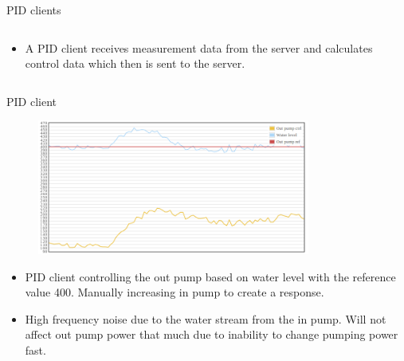 \documentclass{beamer}
\begin{document}
\begin{frame}{PID clients}
\begin{columns}[T]
    \begin{column}{.55\textwidth}
        \begin{itemize}
            \item A PID client receives measurement data from the server and calculates control data which then is sent to the server.            
        \end{itemize}
    \end{column}
    \end{columns}
\end{frame}

\begin{frame}{PID client}
	\begin{figure}
		\center
		\includegraphics[width=0.8\textwidth]{plot1.png}
	\end{figure}
	\begin{itemize}
		\item PID client controlling the out pump based on water level with the reference value 400. Manually increasing in pump to create a response.
		\item High frequency noise due to the water stream from the in pump. Will not affect out pump power that much due to inability to change pumping power fast.
    \end{itemize}
\end{frame}
\end{document}
